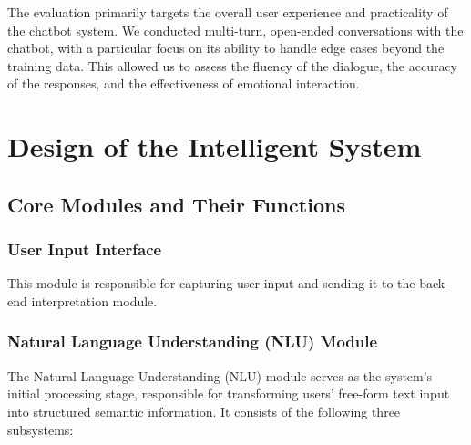 \documentclass{xum_review}
\begin{document}
	The evaluation primarily targets the overall user experience and practicality of the chatbot system. We conducted
	multi-turn, open-ended conversations with the chatbot, with a particular focus on its ability to handle edge cases
	beyond the training data. This allowed us to assess the fluency of the dialogue, the accuracy of the responses, and
	the effectiveness of emotional interaction.

\section{Design of the Intelligent System}

	\subsection{Core Modules and Their Functions}

	\subsubsection{User Input Interface}

	This module is responsible for capturing user input and sending it to the back-end interpretation module.

	\subsubsection{Natural Language Understanding (NLU) Module}

	The Natural Language Understanding (NLU) module serves as the system's initial processing stage, responsible for
	transforming users' free-form text input into structured semantic information\citep{article}. It consists of the following three
	subsystems:
\end{document}
